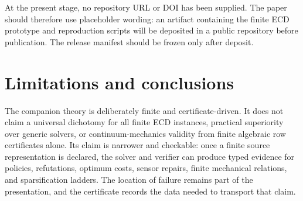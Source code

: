\documentclass[11pt]{article}
\theoremstyle{plain}
\theoremstyle{definition}
\theoremstyle{remark}
\begin{document}
At the present stage, no repository URL or DOI has been supplied.  The paper
should therefore use placeholder wording: an artifact containing the finite ECD
prototype and reproduction scripts will be deposited in a public repository
before publication.  The release manifest should be frozen only after deposit.

\section{Limitations and conclusions}
\label{sec:limitations}

The companion theory is deliberately finite and certificate-driven.  It does not
claim a universal dichotomy for all finite ECD instances, practical superiority
over generic solvers, or continuum-mechanics validity from finite algebraic row
certificates alone.  Its claim is narrower and checkable: once a finite source
representation is declared, the solver and verifier can produce typed evidence
for policies, refutations, optimum costs, sensor repairs, finite mechanical
relations, and sparsification ladders.  The location of failure remains part of
the presentation, and the certificate records the data needed to transport that
claim.


\end{document}
